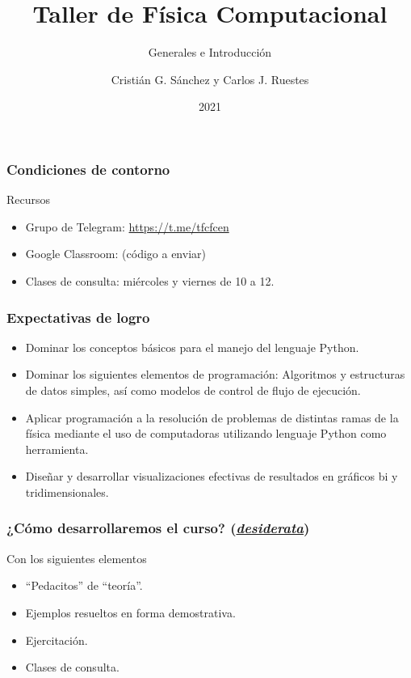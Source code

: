 \documentclass[aspectratio=169]{beamer}
\title{Taller de Física Computacional}
\subtitle{Generales e Introducción}
\author{Cristián G. Sánchez y Carlos J. Ruestes}
\date{2021}
\begin{document}
\frame{\titlepage}


\begin{frame}
\frametitle{Condiciones de contorno}
\begin{block}{Recursos}
\begin{itemize}
\item Grupo de Telegram: \url{https://t.me/tfcfcen}
\item Google Classroom: (código a enviar)
\item Clases de \alert{consulta}: miércoles y viernes de 10 a 12.
\end{itemize}
\end{block}
\end{frame}


\begin{frame}
\frametitle{Expectativas de logro}
\begin{itemize}
\item Dominar los conceptos básicos para el manejo del lenguaje Python. 
\item Dominar los siguientes elementos de programación: Algoritmos y estructuras de datos simples, así como modelos de control de flujo de ejecución. 
\item Aplicar programación a la resolución de problemas de distintas ramas de la física mediante el uso de computadoras utilizando lenguaje Python como herramienta. 
\item Diseñar y desarrollar visualizaciones efectivas de resultados en gráficos bi y tridimensionales.
\end{itemize}
\end{frame}


\begin{frame}
\frametitle{¿Cómo desarrollaremos el curso? ({\em \href{https://dle.rae.es/desiderata}{desiderata}})}
Con los siguientes elementos
\begin{itemize}
\item ``Pedacitos'' de ``teoría''.
\item Ejemplos resueltos en forma demostrativa.
\item Ejercitación.
\item Clases de consulta.
\end{itemize}
\end{frame}
\end{document}
